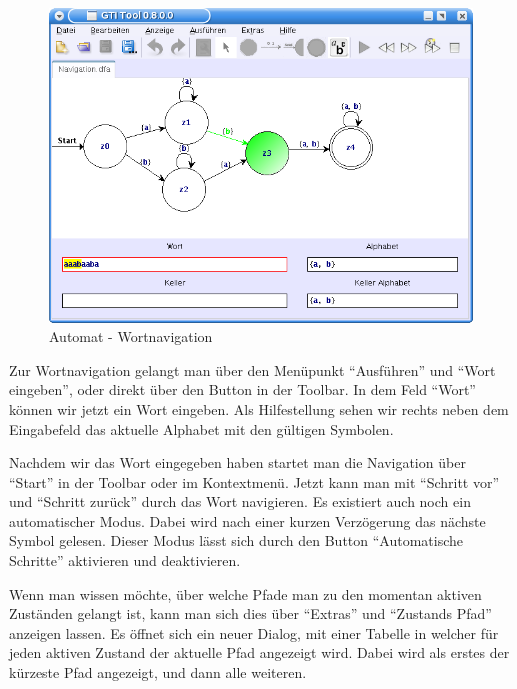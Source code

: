   \begin{figure}[h]
  \begin{center}
  \includegraphics[width=12cm]{images/dfa_navigation.png}
  \caption{Automat - Wortnavigation}
  \end{center}
  \end{figure}
  
  Zur Wortnavigation gelangt man über den Menüpunkt "`Ausführen"' und "`Wort
  eingeben"', oder direkt über den Button in der Toolbar. In dem Feld
  "`Wort"' können wir jetzt ein Wort eingeben. Als Hilfestellung sehen
  wir rechts neben dem Eingabefeld das aktuelle Alphabet mit den gültigen
  Symbolen.\vspace{10pt}
  
  Nachdem wir das Wort eingegeben haben startet man die Navigation über "`Start"'
  in der Toolbar oder im Kontextmenü. Jetzt kann man mit "`Schritt vor"' und
  "`Schritt zurück"' durch das Wort navigieren. Es existiert auch noch ein
  automatischer Modus. Dabei wird nach einer kurzen Verzögerung das nächste
  Symbol gelesen. Dieser Modus lässt sich durch den Button "`Automatische
  Schritte"' aktivieren und deaktivieren.\vspace{10pt}

  Wenn man wissen möchte, über welche Pfade man zu den momentan aktiven Zuständen
  gelangt ist, kann man sich dies über "`Extras"' und "`Zustands Pfad"' anzeigen
  lassen. Es öffnet sich ein neuer Dialog, mit einer Tabelle in welcher für jeden
  aktiven Zustand der aktuelle Pfad angezeigt wird. Dabei wird als erstes der
  kürzeste Pfad angezeigt, und dann alle weiteren.\vspace{10pt}
  
